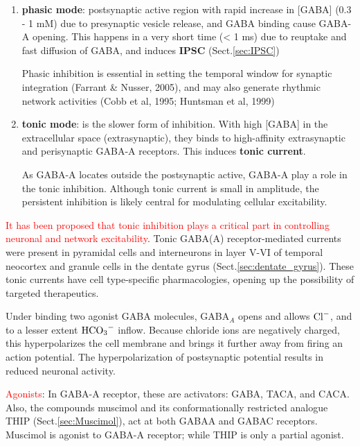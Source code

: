 \begin{enumerate}
  
  \item {\bf phasic mode}: postsynaptic active region with rapid increase in
  [GABA] (0.3 - 1 mM) due to presynaptic vesicle release, and GABA binding cause
  GABA-A opening. This happens in a very short time (< 1 ms) due to reuptake and
  fast diffusion of GABA, and induces {\bf IPSC} (Sect.\ref{sec:IPSC})
  
Phasic inhibition is essential in setting the temporal window for synaptic
integration (Farrant \& Nusser, 2005), and may also generate rhythmic network
activities (Cobb et al, 1995; Huntsman et al, 1999)
  
  \item {\bf tonic mode}: is the slower form of inhibition. With high [GABA] in
  the extracellular space (extrasynaptic), they binds to high-affinity
  extrasynaptic and perisynaptic GABA-A receptors. This induces {\bf tonic
  current}.
  
 As GABA-A locates outside the postsynaptic active, GABA-A play a role in the
 tonic inhibition.  Although tonic current is small in amplitude, the
persistent inhibition is likely central for modulating cellular excitability.

\end{enumerate}
\textcolor{red}{It has been proposed that tonic inhibition plays a critical part
in controlling neuronal and network excitability}.
Tonic GABA(A) receptor-mediated currents were present in pyramidal cells and
interneurons in layer V-VI of temporal neocortex and granule cells in the
dentate gyrus (Sect.\ref{sec:dentate_gyrus}). These tonic currents have cell
type-specific pharmacologies, opening up the possibility of targeted therapeutics.


Under binding two agonist GABA molecules, GABA$_A$ opens and allows ${\text{Cl}^{-}}$, and
to a lesser extent $\ce{HCO3^-}$ inflow.
Because chloride ions are negatively charged, this hyperpolarizes the cell
membrane and brings it further away from firing an action potential.
The hyperpolarization of postsynaptic potential results in reduced neuronal
activity. 

\textcolor{red}{Agonists}: In GABA-A receptor, these are activators: GABA,
TACA, and CACA. Also, the compounds muscimol and its conformationally restricted
analogue THIP (Sect.\ref{sec:Muscimol}), act at both GABAA
and GABAC receptors. Muscimol is agonist to GABA-A receptor; while THIP is only
a partial agonist.


